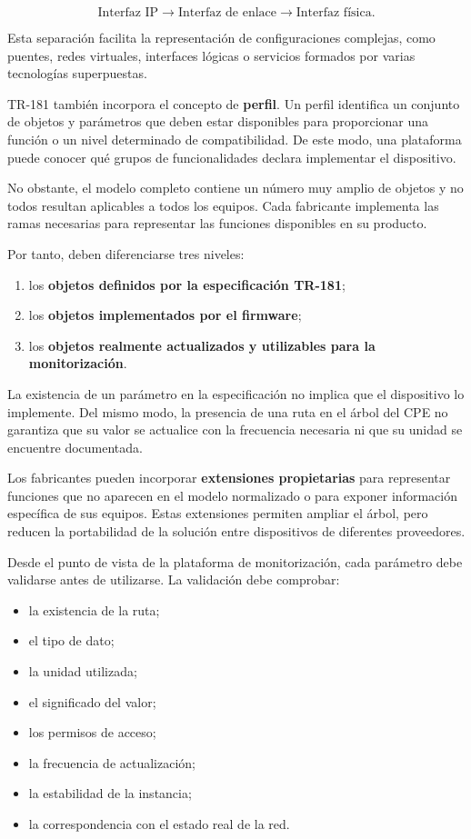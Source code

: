 \[
    \text{Interfaz IP}
    \longrightarrow
    \text{Interfaz de enlace}
    \longrightarrow
    \text{Interfaz física}.
\]

Esta separación facilita la representación de configuraciones complejas,
como puentes, redes virtuales, interfaces lógicas o servicios formados
por varias tecnologías superpuestas.

TR-181 también incorpora el concepto de
\textbf{perfil}. Un perfil identifica un conjunto de objetos y
parámetros que deben estar disponibles para proporcionar una función o
un nivel determinado de compatibilidad. De este modo, una plataforma
puede conocer qué grupos de funcionalidades declara implementar el
dispositivo.

No obstante, el modelo completo contiene un número muy amplio de objetos
y no todos resultan aplicables a todos los equipos. Cada fabricante
implementa las ramas necesarias para representar las funciones
disponibles en su producto.

Por tanto, deben diferenciarse tres niveles:

\begin{enumerate}
    \item los \textbf{objetos definidos por la especificación TR-181};

    \item los \textbf{objetos implementados por el firmware};

    \item los \textbf{objetos realmente actualizados y utilizables para
    la monitorización}.
\end{enumerate}

La existencia de un parámetro en la especificación no implica que el
dispositivo lo implemente. Del mismo modo, la presencia de una ruta en el
árbol del CPE no garantiza que su valor se actualice con la frecuencia
necesaria ni que su unidad se encuentre documentada.

Los fabricantes pueden incorporar
\textbf{extensiones propietarias} para representar funciones que no
aparecen en el modelo normalizado o para exponer información específica
de sus equipos. Estas extensiones permiten ampliar el árbol, pero
reducen la portabilidad de la solución entre dispositivos de diferentes
proveedores.

Desde el punto de vista de la plataforma de monitorización, cada
parámetro debe validarse antes de utilizarse. La validación debe
comprobar:

\begin{itemize}
    \item la existencia de la ruta;
    \item el tipo de dato;
    \item la unidad utilizada;
    \item el significado del valor;
    \item los permisos de acceso;
    \item la frecuencia de actualización;
    \item la estabilidad de la instancia;
    \item la correspondencia con el estado real de la red.
\end{itemize}

